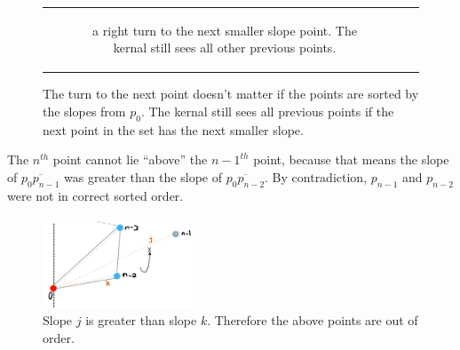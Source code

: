 \documentclass [12pt]{article}
\begin{document}
\begin{enumerate}[label=(\alph*)]
\begin{figure}[h]
\begin{tabular}{cc}
\begin{subfigure}{0.5\textwidth}
                    \caption{a right turn to the next smaller slope point. The kernal still sees all other previous points.}
                    \label{fig:starb}
                \end{subfigure}  
            \end{tabular}
            \caption{The turn to the next point doesn't matter if the points are sorted by the slopes from $p_0$. The kernal still sees all previous points if the next point in the set has the next smaller slope.}
            \label{fig:normalstar}
        \end{figure}

        \pagebreak

        The $n^{th}$ point cannot lie ``above'' the $n-1^{th}$ point, because that means the slope of $\overline{p_0 p_{n - 1}}$ was greater than the slope of $\overline{p_0 p_{n - 2}}$. By contradiction, $p_{n-1}$ and $p_{n-2}$ were not in correct sorted order.

        \begin{figure}[h] 
            \centering
            \includegraphics[width=0.4\textwidth]{images/star9.PNG}
            \caption{Slope $j$ is greater than slope $k$. Therefore the above points are out of order.}
            \label{fig:star9}
        \end{figure} 



\end{enumerate}
\end{document}
